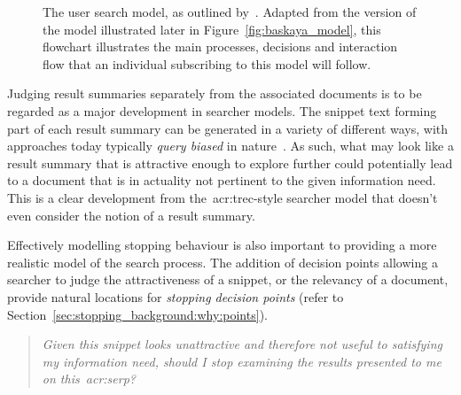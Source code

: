 \begin{figure}[t!]
    \centering
    \caption[Flowchart of the search process by~\cite{baskaya2013behavioural_factors}]{The user search model, as outlined by~\cite{baskaya2013behavioural_factors}. Adapted from the version of the model illustrated later in Figure~\ref{fig:baskaya_model}, this flowchart illustrates the main processes, decisions and interaction flow that an individual subscribing to this model will follow.}
    \label{fig:baskaya_model_flow}
\end{figure}

Judging result summaries separately from the associated documents is to be regarded as a major development in searcher models. The snippet text forming part of each result summary can be generated in a variety of different ways, with approaches today typically \emph{query biased} in nature~\citep{tombros1998query_biased}. As such, what may look like a result summary that is attractive enough to explore further could potentially lead to a document that is in actuality not pertinent to the given information need. This is a clear development from the~\gls{acr:trec}-style searcher model that doesn't even consider the notion of a result summary.

Effectively modelling stopping behaviour is also important to providing a more realistic model of the search process. The addition of decision points allowing a searcher to judge the attractiveness of a snippet, or the relevancy of a document, provide natural locations for \emph{stopping decision points} (refer to Section~\ref{sec:stopping_background:why:points}).

\begin{quote}
\emph{Given this snippet looks unattractive and therefore not useful to satisfying my information need, should I stop examining the results presented to me on this~\gls{acr:serp}?}
\end{quote}

